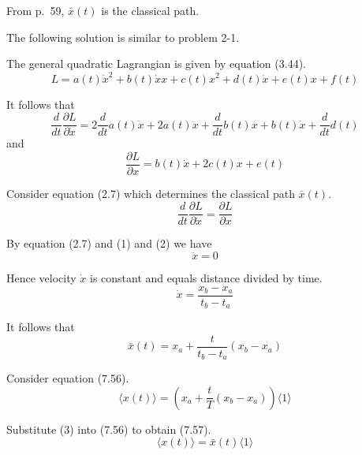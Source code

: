 


From p.~59, $\bar x(t)$ is the classical path.

\bigskip
The following solution is similar to problem 2-1.

\bigskip
The general quadratic Lagrangian is given by equation (3.44).
\begin{equation*}
L=a(t)\dot x^2+b(t)\dot xx+c(t)x^2+d(t)\dot x+e(t)x+f(t)
\tag{3.44}
\end{equation*}

It follows that
\begin{equation*}
\frac{d}{dt}\frac{\partial L}{\partial\dot x}
=2\frac{d}{dt}a(t)\dot x+2a(t)\ddot x
+\frac{d}{dt}b(t)x+b(t)\dot x+\frac{d}{dt}d(t)
\tag{1}
\end{equation*}
and
\begin{equation*}
\frac{\partial L}{\partial x}
=b(t)\dot x+2c(t)x+e(t)
\tag{2}
\end{equation*}

Consider equation (2.7) which determines the classical path $\bar x(t)$.
\begin{equation*}
\frac{d}{dt}\frac{\partial L}{\partial\dot x}=\frac{\partial L}{\partial x}
\tag{2.7}
\end{equation*}

By equation (2.7) and (1) and (2) we have
\begin{equation*}
\ddot x=0
\end{equation*}

Hence velocity $\dot x$ is constant and equals distance divided by time.
\begin{equation*}
\dot x=\frac{x_b-x_a}{t_b-t_a}
\end{equation*}

It follows that
\begin{equation*}
\bar x(t)=x_a+\frac{t}{t_b-t_a}(x_b-x_a)
\tag{3}
\end{equation*}

Consider equation (7.56).
\begin{equation*}
\langle x(t)\rangle=
\left(x_a+\frac{t}{T}(x_b-x_a)\right)\langle1\rangle
\tag{7.56}
\end{equation*}

Substitute (3) into (7.56) to obtain (7.57).
\begin{equation*}
\langle x(t)\rangle=\bar x(t)\langle1\rangle
\tag{7.57}
\end{equation*}



